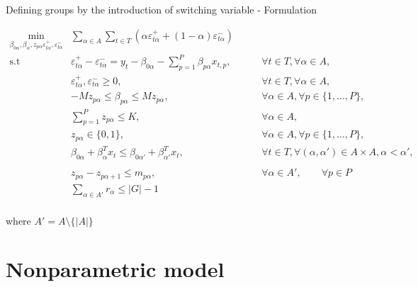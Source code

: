 \documentclass[ignorenonframetext,]{beamer}
\begin{document}
\begin{frame}{Defining groups by the introduction of switching variable
- Formulation}

\tiny

\begin{eqnarray}
\underset{\beta_{0\alpha},\beta_\alpha,z_{p \alpha} \varepsilon_{t \alpha}^{+},\varepsilon_{t \alpha}^{-}}{\text{min}} & \sum_{\alpha \in A} \sum_{t\in T}\left(\alpha\varepsilon_{t \alpha}^{+}+(1-\alpha)\varepsilon_{t\alpha}^{-}\right) \label{eq:mipgr0} \\
\mbox{s.t } & \varepsilon_{t \alpha}^{+}-\varepsilon_{t \alpha}^{-}=y_{t}-\beta_{0 \alpha}-\sum_{p=1}^{P}\beta_{p \alpha}x_{t,p},& \qquad\forall t \in T ,\forall \alpha \in A, \label{eq:mipgr1}\\
& \varepsilon_{t \alpha}^{+},\varepsilon_{t \alpha}^{-}\geq0,&\qquad\forall t \in T ,\forall \alpha \in A, \label{eq:mipgr2}\\
& - M z_{p \alpha} \leq \beta_{p \alpha} \leq M z_{p \alpha},&\qquad \forall \alpha \in A, \forall p\in\{1,\dots,P\}, \label{eq:mipgr3}\\
& \sum_{p=1}^P z_{p \alpha} \leq K, & \qquad \forall \alpha \in A, \label{eq:mipgr4}\\
& z_{p \alpha} \in \{0,1\},&\qquad \forall \alpha \in A, \forall p\in\{1,\dots,P\}, \label{eq:mipgr5}\\
& \beta_{0\alpha} + \beta_{\alpha}^T x_{t} \leq \beta_{0\alpha'} + \beta_{\alpha'}^T x_{t}, & \qquad \forall t \in T, \forall (\alpha, \alpha') \in A \times A,  \alpha < \alpha',\nonumber\\ \label{eq:mipgr6} \\
& z_{p\alpha} - z_{p\alpha+1} \leq m_{p\alpha}, & \qquad \forall \alpha \in A', \qquad \forall p \in P  \\
& \sum_{\alpha \in A'} r_\alpha \leq |G| - 1 
\label{eq:mipgr} \\
\end{eqnarray}

where \(A' = A\setminus \{|A|\}\) \normalsize

\end{frame}

\section{Nonparametric model}\label{nonparametric-model}
\end{document}
